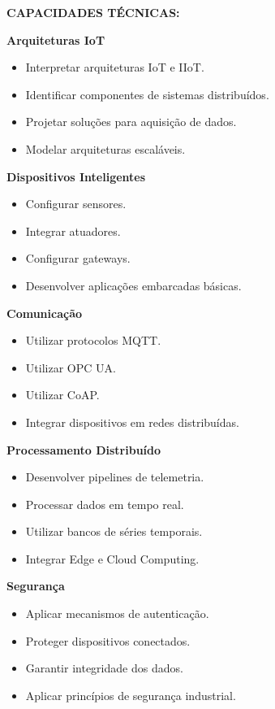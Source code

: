 \textbf{CAPACIDADES TÉCNICAS:}

\textbf{Arquiteturas IoT}

\begin{itemize}
\item Interpretar arquiteturas IoT e IIoT.
\item Identificar componentes de sistemas distribuídos.
\item Projetar soluções para aquisição de dados.
\item Modelar arquiteturas escaláveis.
\end{itemize}

\textbf{Dispositivos Inteligentes}

\begin{itemize}
\item Configurar sensores.
\item Integrar atuadores.
\item Configurar gateways.
\item Desenvolver aplicações embarcadas básicas.
\end{itemize}

\textbf{Comunicação}

\begin{itemize}
\item Utilizar protocolos MQTT.
\item Utilizar OPC UA.
\item Utilizar CoAP.
\item Integrar dispositivos em redes distribuídas.
\end{itemize}

\textbf{Processamento Distribuído}

\begin{itemize}
\item Desenvolver pipelines de telemetria.
\item Processar dados em tempo real.
\item Utilizar bancos de séries temporais.
\item Integrar Edge e Cloud Computing.
\end{itemize}

\textbf{Segurança}

\begin{itemize}
\item Aplicar mecanismos de autenticação.
\item Proteger dispositivos conectados.
\item Garantir integridade dos dados.
\item Aplicar princípios de segurança industrial.
\end{itemize}

